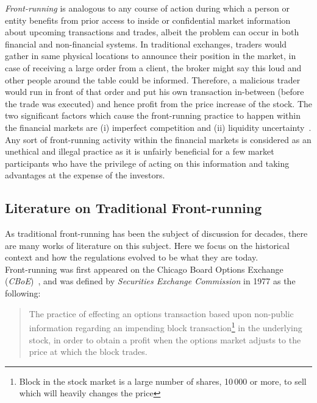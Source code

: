 \emph{Front-running} is analogous to any course of action during which a person or entity benefits from prior access to inside or confidential market information about upcoming transactions and trades, albeit the problem can occur in both financial and non-financial systems.  In traditional exchanges, traders would gather in same physical locations to announce their position in the market, in case of receiving a large order from a client, the broker might say this loud and other people around the table could be informed. Therefore, a malicious trader would run in front of that order and put his own transaction in-between (before the trade was executed) and hence profit from the price increase of the stock. 
The two significant factors which cause the front-running practice to happen within the financial markets are (i) imperfect competition and (ii) liquidity uncertainty~\cite{liang2005distressed}. Any sort of front-running activity within the financial markets is considered as an unethical and illegal practice as it is unfairly beneficial for a few market participants who have the privilege of acting on this information and taking advantages at the expense of the investors. 

\subsection{Literature on Traditional Front-running}\label{traditionalFrontrunning}
As traditional front-running has been the subject of discussion for decades, there are many works of literature on this subject. Here we focus on the historical context and how the regulations evolved to be what they are today.\\
Front-running was first appeared on the Chicago Board Options Exchange (\textit{CBoE})~\cite{markham1988front}, and was defined by \textit{Securities Exchange Commission} in 1977 as the following:
\begin{quote}
The practice of effecting an options transaction based upon non-public information regarding an impending block transaction\footnote{Block in the stock market is a large number of shares, 10\,000 or more, to sell which will heavily changes the price} in the underlying stock, in order to obtain a profit when the options market adjusts to the price at which the block trades. ~\cite{sec1978optionsmarket}
\end{quote} 

